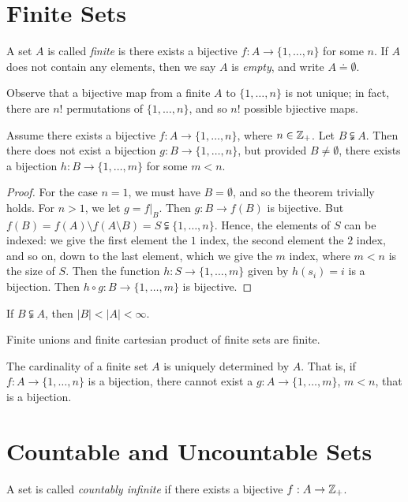 \section{Finite Sets} 
\begin{definition}
	A set $A$ is called \emph{finite} is there exists a bijective
	$f: A \to \{ 1, \dots, n\}$ for some $n$. If $A$ does not contain any
	elements, then we say $A$ is \emph{empty}, and write $A \doteq \emptyset$.
\end{definition}
Observe that a bijective map from a finite $A$ to $\{1, \dots, n\}$ is not
unique; in fact, there are $n$! permutations of $\{1, \dots, n\}$, and so $n$! possible
bjiective maps. 
\begin{theorem}\label{thm:subset-bij}
	Assume there exists a bijective $f: A \to \{1, \dots, n\}$, where $n \in
	\mathbb{Z}_{+}$. Let $B \subsetneqq A$. Then there does not exist a bijection $g: B
	\to \{1, \dots, n\}$, but provided $B \neq \emptyset$, there exists a
	bijection $h: B \to \{1, \dots, m\}$ for some $m < n$.	
\end{theorem}
\begin{proof}
	For the case $n=1$, we must have $B = \emptyset$, and so the theorem
	trivially holds. For $n>1$, we let $g = f |_{B}$. Then $g: B \to f(B)$ is bijective. But
	$f(B) = f(A) \setminus f(A \setminus B) = S \subsetneqq \{1, \dots, n\}$.
	Hence, the elements of $S$ can be indexed: we give the first element the
	$1$ index, the second element the $2$ index, and so on, down to the last
	element, which we give the $m$ index, where $m < n$ is the size of $S$. 
	Then the function $h: S \to \{1, \dots, m\}$ given by $h(s_{i}) = i$
	is a bijection. Then $h \circ g: B \to \{1, \dots, m\}$ is bijective.
\end{proof}
\begin{corollary}
	If $B \subsetneqq A$, then $|B| < |A| < \infty$.
\end{corollary}
\begin{corollary}
	Finite unions and finite cartesian product of finite sets are finite.
\end{corollary}
\begin{corollary}
	The cardinality of a finite set $A$ is uniquely determined by $A$. That is,
	if $f: A \to \{1, \dots, n\}$ is a bijection, there cannot exist a 
	$g: A \to \{ 1, \dots, m\}$, $m < n$, that is a bijection.
\end{corollary}
\section{Countable and Uncountable Sets} 
\begin{definition}
	A set is called \emph{countably infinite} if there exists a bijective
	$f: A \to \mathbb{Z}_{+}$. 
\end{definition}

